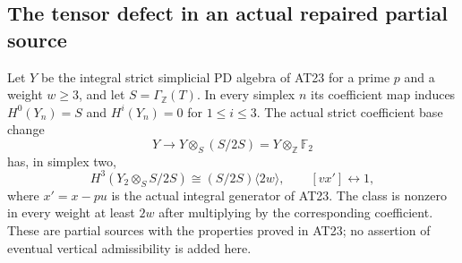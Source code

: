 \subsection{The tensor defect in an actual repaired partial source}

\begin{proposition}
\label{AL17}
Let $Y$ be the integral strict simplicial PD algebra of
AT23 for a prime $p$ and a weight $w\geq3$, and let
$S=\Gamma_{\mathbb Z}(T)$. In every simplex $n$ its
coefficient map induces $H^0(Y_n)=S$ and
$H^i(Y_n)=0$ for $1\leq i\leq3$.
The actual strict coefficient base change
\[
 Y\longrightarrow Y\otimes_S(S/2S)=Y\otimes_{\mathbb Z}\mathbb F_2
 \tag{AL.91}
\]
has, in simplex two,
\[
 H^3(Y_2\otimes_S S/2S)
      \cong (S/2S)\langle2w\rangle,
 \qquad [v x']\longleftrightarrow1,
 \tag{AL.92}
\]
where $x'=x-pu$ is the actual integral generator of
AT23. The class is nonzero in every weight at least
$2w$ after multiplying by the corresponding coefficient.
These are partial sources with the properties proved
in AT23; no assertion of eventual vertical admissibility
is added here.
\end{proposition}

